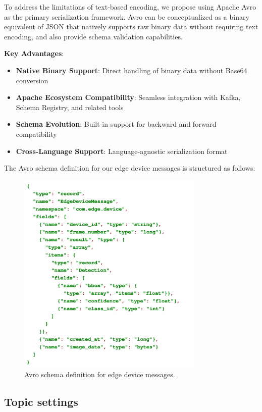 To address the limitations of text-based encoding, we propose using Apache Avro as the primary serialization framework. Avro can be conceptualized as a binary equivalent of JSON that natively supports raw binary data without requiring text encoding, and also provide schema validation capabilities.

\textbf{Key Advantages}:
\begin{itemize}
    \item \textbf{Native Binary Support}: Direct handling of binary data without Base64 conversion
    \item \textbf{Apache Ecosystem Compatibility}: Seamless integration with Kafka, Schema Registry, and related tools
    \item \textbf{Schema Evolution}: Built-in support for backward and forward compatibility
    \item \textbf{Cross-Language Support}: Language-agnostic serialization format
\end{itemize}

The Avro schema definition for our edge device messages is structured as follows:

\begin{figure}[htbp]
    \centering
    \includegraphics[width=0.8\textwidth]{Figure/avro_def.png}
    \caption{Avro schema definition for edge device messages.}
    \label{fig:avro_schema}
\end{figure}


\subsection{Topic settings}

